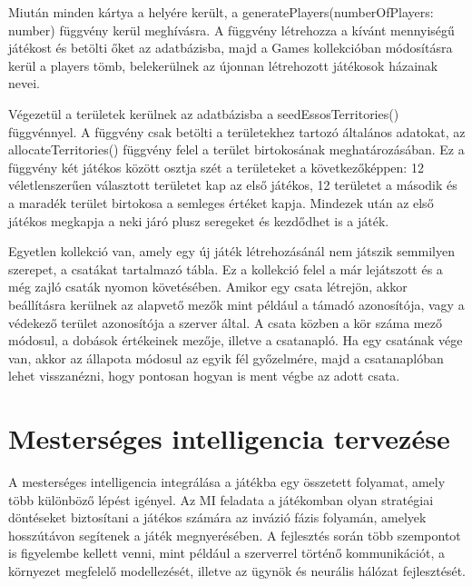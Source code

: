 \documentclass[
]{thesis-ekf}
\theoremstyle{definition}
\theoremstyle{remark}
\begin{document}


Miután minden kártya a helyére került, a generatePlayers(numberOfPlayers: number) függvény kerül meghívásra. A függvény létrehozza a kívánt mennyiségű játékost és betölti őket az adatbázisba, majd a Games kollekcióban módosításra kerül a players tömb, belekerülnek az újonnan létrehozott játékosok házainak nevei.

Végezetül a területek kerülnek az adatbázisba a seedEssosTerritories() függvénnyel. A függvény csak betölti a területekhez tartozó általános adatokat, az allocateTerritories() függvény felel a terület birtokosának meghatározásában. Ez a függvény két játékos között osztja szét a területeket a következőképpen: 12 véletlenszerűen választott területet kap az első játékos, 12 területet a második és a maradék terület birtokosa a semleges értéket kapja. Mindezek után az első játékos megkapja a neki járó plusz seregeket és kezdődhet is a játék.

Egyetlen kollekció van, amely egy új játék létrehozásánál nem játszik semmilyen szerepet, a csatákat tartalmazó tábla. Ez a kollekció felel a már lejátszott és a még zajló csaták nyomon követésében. Amikor egy csata létrejön, akkor beállításra kerülnek az alapvető mezők mint például a támadó azonosítója, vagy a védekező terület azonosítója a szerver által. A csata közben a kör száma mező módosul, a dobások értékeinek mezője, illetve a csatanapló. Ha egy csatának vége van, akkor az állapota módosul az egyik fél győzelmére, majd a csatanaplóban lehet visszanézni, hogy pontosan hogyan is ment végbe az adott csata.


\chapter{Mesterséges intelligencia tervezése}

A mesterséges intelligencia integrálása a játékba egy összetett folyamat, amely több különböző lépést igényel. Az MI feladata a játékomban olyan stratégiai döntéseket biztosítani a játékos számára az invázió fázis folyamán, amelyek hosszútávon segítenek a játék megnyerésében. A fejlesztés során több szempontot is figyelembe kellett venni, mint például a szerverrel történő kommunikációt, a környezet megfelelő modellezését, illetve az ügynök és neurális hálózat fejlesztését.
\end{document}
